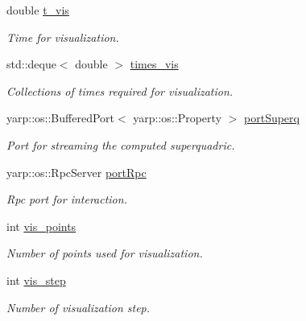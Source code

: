 \begin{DoxyCompactItemize}
\mbox{\label{classSuperqModule_ac4b02568e69c9ed84739bb252a31def6}} 
double \mbox{\hyperlink{classSuperqModule_ac4b02568e69c9ed84739bb252a31def6}{t\+\_\+vis}}
\begin{DoxyCompactList}\small\item\em Time for visualization. \end{DoxyCompactList}\item 
\mbox{\label{classSuperqModule_af8194f823d1dfc5072988680d71aab08}} 
std\+::deque$<$ double $>$ \mbox{\hyperlink{classSuperqModule_af8194f823d1dfc5072988680d71aab08}{times\+\_\+vis}}
\begin{DoxyCompactList}\small\item\em Collections of times required for visualization. \end{DoxyCompactList}\item 
\mbox{\label{classSuperqModule_ac73ad3c50ea4fe58e35a722c37a7f99e}} 
yarp\+::os\+::\+Buffered\+Port$<$ yarp\+::os\+::\+Property $>$ \mbox{\hyperlink{classSuperqModule_ac73ad3c50ea4fe58e35a722c37a7f99e}{port\+Superq}}
\begin{DoxyCompactList}\small\item\em Port for streaming the computed superquadric. \end{DoxyCompactList}\item 
\mbox{\label{classSuperqModule_ab44a4843a8cb533d80d55df985b11448}} 
yarp\+::os\+::\+Rpc\+Server \mbox{\hyperlink{classSuperqModule_ab44a4843a8cb533d80d55df985b11448}{port\+Rpc}}
\begin{DoxyCompactList}\small\item\em Rpc port for interaction. \end{DoxyCompactList}\item 
\mbox{\label{classSuperqModule_ae8e5d7e83ef5cd80a44ce6a3bcc74cd7}} 
int \mbox{\hyperlink{classSuperqModule_ae8e5d7e83ef5cd80a44ce6a3bcc74cd7}{vis\+\_\+points}}
\begin{DoxyCompactList}\small\item\em Number of points used for visualization. \end{DoxyCompactList}\item 
\mbox{\label{classSuperqModule_a73aa4f6c8c4c9142fb5456c9cdaaf6b6}} 
int \mbox{\hyperlink{classSuperqModule_a73aa4f6c8c4c9142fb5456c9cdaaf6b6}{vis\+\_\+step}}
\begin{DoxyCompactList}\small\item\em Number of visualization step. \end{DoxyCompactList}\item 

\end{DoxyCompactItemize}
